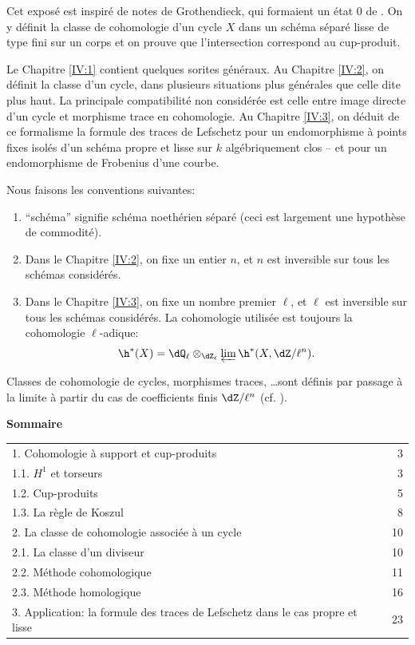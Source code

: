 Cet exposé est inspiré de notes de Grothendieck, qui formaient un état 0 
de . On y définit la classe de cohomologie d'un cycle $X$ dans 
un schéma séparé lisse de type fini sur un corps et on prouve que 
l'intersection correspond au cup-produit.

Le Chapitre \ref{IV:1} contient quelques sorites généraux. Au Chapitre \ref{IV:2}, on 
définit la classe d'un cycle, dans plusieurs situations plus générales 
que celle dite plus haut. La principale compatibilité non considérée est 
celle entre image directe d'un cycle et morphisme trace en cohomologie. Au 
Chapitre \ref{IV:3}, on déduit de ce formalisme la formule des traces de Lefschetz pour 
un endomorphisme à points fixes isolés d'un schéma propre et lisse sur $k$ 
algébriquement clos -- et pour un endomorphisme de Frobenius d'une courbe. 

Nous faisons les conventions suivantes:
\begin{enumerate}[\indent 1)]
  \item ``schéma'' signifie schéma noethérien séparé (ceci est 
    largement une hypothèse de commodité).
  \item Dans le Chapitre \ref{IV:2}, on fixe un entier $n$, et $n$ est inversible sur 
    tous les schémas considérés.
  \item Dans le Chapitre \ref{IV:3}, on fixe un nombre premier $\ell$, et $\ell$ est 
    inversible sur tous les schémas considérés. La cohomologie utilisée 
    est toujours la cohomologie $\ell$-adique:
    \[
      \h^*(X) = \dQ_\ell\otimes_{\dZ_\ell} \varprojlim \h^*(X,\dZ/\ell^n) \text{.}
    \]
\end{enumerate}
Classes de cohomologie de cycles, morphismes traces, \ldots sont définis par 
passage à la limite à partir du cas de coefficients finis $\dZ/\ell^n$ (cf. 
).




















\begin{center}\textbf{Sommaire}\end{center}
\begin{tabular}{p{}r}
1. Cohomologie à support et cup-produits & 3\\
1.1. $H^1$ et torseurs & 3\\
1.2. Cup-produits & 5\\
1.3. La règle de Koszul & 8\\
2. La classe de cohomologie associée à un cycle & 10\\
2.1. La classe d'un diviseur & 10\\
2.2. Méthode cohomologique & 11\\
2.3. Méthode homologique & 16\\
3. Application: la formule des traces de Lefschetz dans le cas propre et lisse & 23
\end{tabular}

